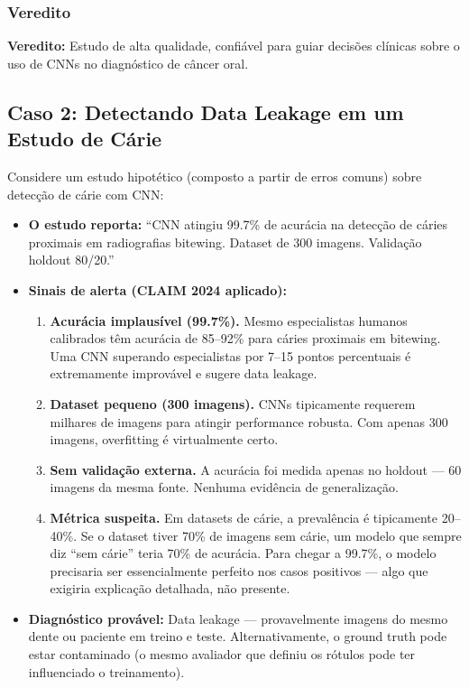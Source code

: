 \subsubsection{Veredito}

\textbf{Veredito:} Estudo de alta qualidade, confiável para guiar decisões clínicas sobre o uso de CNNs no diagnóstico de câncer oral.

\subsection{Caso 2: Detectando Data Leakage em um Estudo de Cárie}

Considere um estudo hipotético (composto a partir de erros comuns) sobre detecção de cárie com CNN:

\begin{itemize}
    \item \textbf{O estudo reporta:} ``CNN atingiu 99.7\% de acurácia na detecção de cáries proximais em radiografias bitewing. Dataset de 300 imagens. Validação holdout 80/20.''
    \item \textbf{Sinais de alerta (CLAIM 2024 aplicado):}
    \begin{enumerate}
        \item \textbf{Acurácia implausível (99.7\%).} Mesmo especialistas humanos calibrados têm acurácia de 85--92\% para cáries proximais em bitewing. Uma CNN superando especialistas por 7--15 pontos percentuais é extremamente improvável e sugere data leakage.
        \item \textbf{Dataset pequeno (300 imagens).} CNNs tipicamente requerem milhares de imagens para atingir performance robusta. Com apenas 300 imagens, overfitting é virtualmente certo.
        \item \textbf{Sem validação externa.} A acurácia foi medida apenas no holdout — 60 imagens da mesma fonte. Nenhuma evidência de generalização.
        \item \textbf{Métrica suspeita.} Em datasets de cárie, a prevalência é tipicamente 20--40\%. Se o dataset tiver 70\% de imagens sem cárie, um modelo que sempre diz ``sem cárie'' teria 70\% de acurácia. Para chegar a 99.7\%, o modelo precisaria ser essencialmente perfeito nos casos positivos — algo que exigiria explicação detalhada, não presente.
    \end{enumerate}
    \item \textbf{Diagnóstico provável:} Data leakage — provavelmente imagens do mesmo dente ou paciente em treino e teste. Alternativamente, o ground truth pode estar contaminado (o mesmo avaliador que definiu os rótulos pode ter influenciado o treinamento).
\end{itemize}

